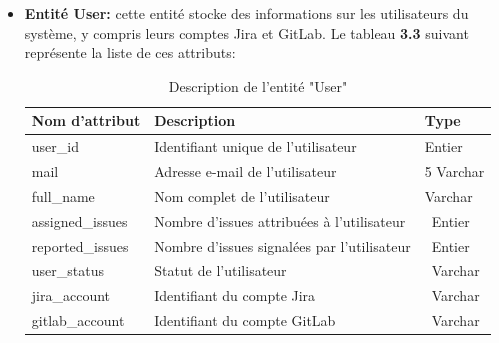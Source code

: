 \begin{itemize}
\begin{center}
\begin{longtable}{|p{5cm}|p{9cm}|p{2cm}|}
                \end{longtable}

            \end{center}
        \vspace{-1cm}
        \item \textbf{Entité User:} cette entité stocke des informations sur les utilisateurs du système, y compris leurs comptes Jira et GitLab.
        Le tableau \textbf{3.3} suivant représente la liste de ces attributs:
        \begin{center}   
                \begin{longtable}{|p{3cm}|p{11cm}|p{2cm}|}
                    \caption {Description de l'entité "User"} \\
                    \hline
                    \rowcolor{blue!18}\textbf{\large{Nom d'attribut}} & \textbf{\large{Description}} & \textbf{\large{Type}} \\
                    \hline
                    user\_id& Identifiant unique de l'utilisateur&  Entier\\\hline
                    mail&Adresse e-mail de l'utilisateur& 5 Varchar\\\hline
                    full\_name& Nom complet de l'utilisateur& Varchar\\\hline
                    assigned\_issues& Nombre d'issues attribuées à l'utilisateur&\ Entier\\\hline
                    reported\_issues&Nombre d'issues signalées par l'utilisateur&\ Entier\\\hline
                    user\_status & Statut de l'utilisateur&\ Varchar\\\hline
                    jira\_account  & Identifiant du compte Jira &\ Varchar\\\hline
                    gitlab\_account  &  Identifiant du compte GitLab&\ Varchar\\\hline


                \end{longtable}
            

\end{center}
\end{itemize}

